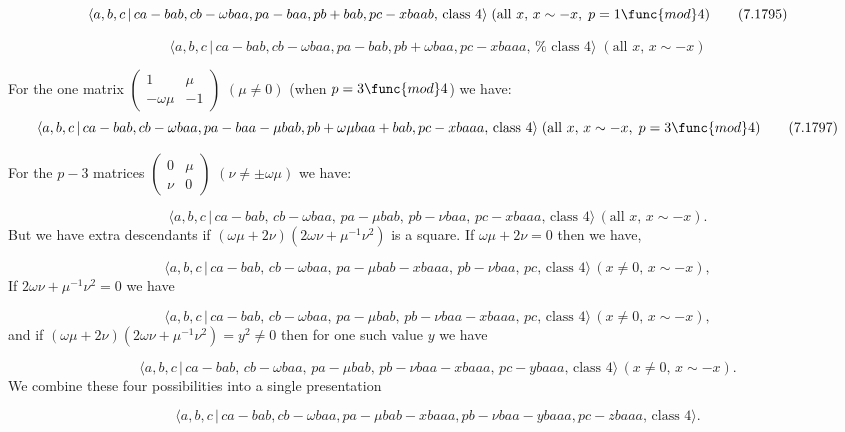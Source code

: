 \documentclass[10pt]{article}
\begin{document}
\begin{equation}
\langle a,b,c\,|\,ca-bab,cb-\omega baa,pa-baa,pb+bab,pc-xbaab,\,\text{class }%
4\rangle \;(\text{all }x,\,x\sim -x,\;p=1\func{mod}4)  \tag{7.1795}
\end{equation}

\begin{equation}
\langle a,b,c\,|\,ca-bab,cb-\omega baa,pa-bab,pb+\omega baa,pc-xbaaa,\,\text{%
class }4\rangle \;(\text{all }x,\,x\sim -x)  \tag{7.1796}
\end{equation}

For the one matrix $\left( 
\begin{array}{ll}
1 & \mu \\ 
-\omega \mu & -1%
\end{array}%
\right) $ $(\mu \neq 0)$ (when $p=3\func{mod}4$) we have:%
\begin{equation}
\langle a,b,c\,|\,ca-bab,cb-\omega baa,pa-baa-\mu bab,pb+\omega \mu
baa+bab,pc-xbaaa,\,\text{class }4\rangle \;(\text{all }x,\,x\sim -x,\;p=3%
\func{mod}4)  \tag{7.1797}
\end{equation}

For the $p-3$ matrices $\left( 
\begin{array}{ll}
0 & \mu \\ 
\nu & 0%
\end{array}%
\right) $ $(\nu \neq \pm \omega \mu )$ we have:

\[
\langle a,b,c\,|\,ca-bab,\,cb-\omega baa,\,pa-\mu bab,\,pb-\nu
baa,\,pc-xbaaa,\,\text{class }4\rangle \,(\text{all }x,\,x\sim -x).
\]%
But we have extra descendants if $(\omega \mu +2\nu )(2\omega \nu +\mu
^{-1}\nu ^{2})$ is a square. If $\omega \mu +2\nu =0$ then we have,

\[
\langle a,b,c\,|\,ca-bab,\,cb-\omega baa,\,pa-\mu bab-xbaaa,\,pb-\nu
baa,\,pc,\,\text{class }4\rangle \,(x\neq 0,\,x\sim -x), 
\]%
If $2\omega \nu +\mu ^{-1}\nu ^{2}=0$ we have

\[
\langle a,b,c\,|\,ca-bab,\,cb-\omega baa,\,pa-\mu bab,\,pb-\nu
baa-xbaaa,\,pc,\,\text{class }4\rangle \,(x\neq 0,\,x\sim -x), 
\]%
and if $(\omega \mu +2\nu )(2\omega \nu +\mu ^{-1}\nu ^{2})=y^{2}\neq 0$
then for one such value $y$ we have

\[
\langle a,b,c\,|\,ca-bab,\,cb-\omega baa,\,pa-\mu bab,\,pb-\nu
baa-xbaaa,\,pc-ybaaa,\,\text{class }4\rangle \,(x\neq 0,\,x\sim -x). 
\]%
We combine these four possibilities into a single presentation

\begin{equation}
\langle a,b,c\,|\,ca-bab,cb-\omega baa,pa-\mu bab-xbaaa,pb-\nu
baa-ybaaa,pc-zbaaa,\,\text{class }4\rangle .  \tag{7.1798}
\end{equation}
\end{document}
